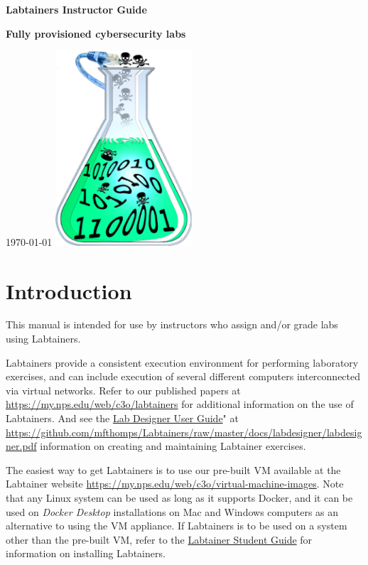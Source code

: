 \documentclass[12pt]{article}
\begin{document}
\begin{titlepage}
\centering
\vfill
\vspace*{4\baselineskip}
{\bfseries\Large
Labtainers Instructor Guide\par
}
\vspace*{4\baselineskip}
{\bfseries
Fully provisioned cybersecurity labs\par
}
\vspace*{2\baselineskip}
\today
\vfill
\includegraphics[width=2in]{labtainer5-sm.png}
\vfill
\end{titlepage}

\section {Introduction}
This manual is intended for use by instructors who assign and/or grade
labs using Labtainers.

Labtainers provide a consistent execution environment for performing
laboratory exercises, and can include execution of several different
computers interconnected via virtual networks.  Refer to our published
papers at \url{https://my.nps.edu/web/c3o/labtainers} for additional information
on the use of Labtainers.  And see the \underline{Lab Designer User Guide}"
at \url{https://github.com/mfthomps/Labtainers/raw/master/docs/labdesigner/labdesigner.pdf}
information on creating and maintaining Labtainer exercises.

The easiest way to get Labtainers is to use our pre-built VM available at the Labtainer
website \url{https://my.nps.edu/web/c3o/virtual-machine-images}.
Note that any Linux system can be used as long as it supports Docker,
and it can be used on \textit{Docker Desktop} installations on 
Mac and Windows computers as an alternative to using the VM appliance.
If Labtainers is to be used on a system other than the pre-built VM,
refer to the \underline{Labtainer Student Guide} for information on
installing Labtainers.
\end{document}
